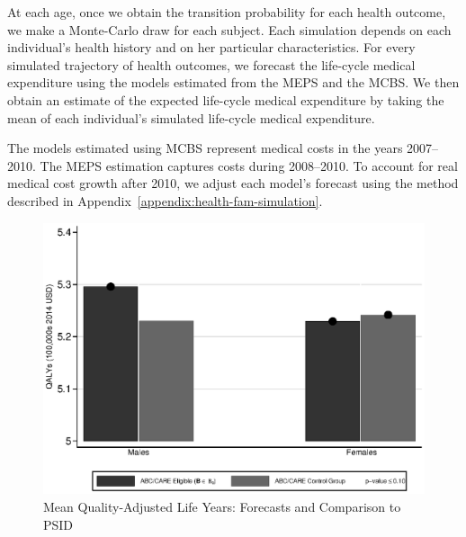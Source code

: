 At each age, once we obtain the transition probability for each health outcome, we make a Monte-Carlo draw for each subject. Each simulation depends on each individual's health history and on her particular characteristics. For every simulated trajectory of health outcomes, we forecast the life-cycle medical expenditure using the models estimated from the MEPS and the MCBS. We then obtain an estimate of the expected life-cycle medical expenditure by taking the mean of each individual's simulated life-cycle medical expenditure.

The models estimated using MCBS represent medical costs in the years 2007--2010. The MEPS estimation captures costs during 2008--2010. To account for real medical cost growth after 2010, we adjust each model's forecast using the method described in  Appendix~\ref{appendix:health-fam-simulation}.

\begin{figure}[!htbp]
\caption{Mean Quality-Adjusted Life Years: Forecasts and Comparison to PSID}\label{fig:qalys}
\centering
\includegraphics[width=.7\columnwidth]{output/qalyexppsid.eps}
\end{figure}

